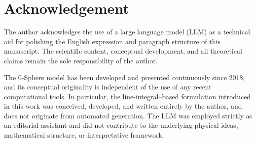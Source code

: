 \documentclass[%
 reprint,
 amsmath,amssymb,
 aps,
 prb,
]{revtex4-2}
\numberwithin{equation}{section}
\begin{document}
\section*{Acknowledgement}

The author acknowledges the use of a large language model (LLM) as a technical aid for polishing the English expression and paragraph structure of this manuscript. The scientific content, conceptual development, and all theoretical claims remain the sole responsibility of the author.  

The 0-Sphere model has been developed and presented continuously since 2018, and its conceptual originality is independent of the use of any recent computational tools. In particular, the line-integral--based formulation introduced in this work was conceived, developed, and written entirely by the author, and does not originate from automated generation. The LLM was employed strictly as an editorial assistant and did not contribute to the underlying physical ideas, mathematical structure, or interpretative framework.


\clearpage
\end{document}
